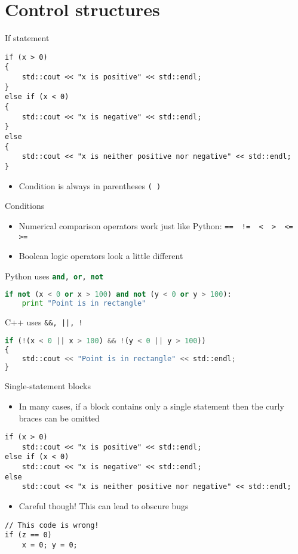 \part{Control structures}
\frame{\partpage}

\begin{frame}[fragile]{If statement}
	\begin{lstlisting}
if (x > 0)
{
    std::cout << "x is positive" << std::endl;
}
else if (x < 0)
{
    std::cout << "x is negative" << std::endl;
}
else
{
    std::cout << "x is neither positive nor negative" << std::endl;
}
	\end{lstlisting}
    \pause
    \begin{itemize}
        \item Condition is always in parentheses \lstinline{( )}
    \end{itemize}
\end{frame}

\begin{frame}[fragile]{Conditions}
    \begin{itemize}
        \item Numerical comparison operators work just like Python:
        \lstinline{==  !=  <  >  <=  >=}
        \item Boolean logic operators look a little different
    \end{itemize}
    Python uses \lstinline[language=Python]{and, or, not}
    \begin{lstlisting}[language=Python]
if not (x < 0 or x > 100) and not (y < 0 or y > 100):
    print "Point is in rectangle"
    \end{lstlisting}
    C++ uses \lstinline{&&, ||, !}
    \begin{lstlisting}[language=Python]
if (!(x < 0 || x > 100) && !(y < 0 || y > 100))
{
    std::cout << "Point is in rectangle" << std::endl;
}
    \end{lstlisting}
\end{frame}

\begin{frame}[fragile]{Single-statement blocks}
    \begin{itemize}
        \item In many cases, if a block contains only a single statement then the curly braces can be omitted
    \end{itemize}
    \begin{lstlisting}
if (x > 0)
    std::cout << "x is positive" << std::endl;
else if (x < 0)
    std::cout << "x is negative" << std::endl;
else
    std::cout << "x is neither positive nor negative" << std::endl;
    \end{lstlisting}
    \begin{itemize}
        \item Careful though! This can lead to obscure bugs
    \end{itemize}
    \begin{lstlisting}
// This code is wrong!
if (z == 0)
    x = 0; y = 0;
    \end{lstlisting}
\end{frame}

